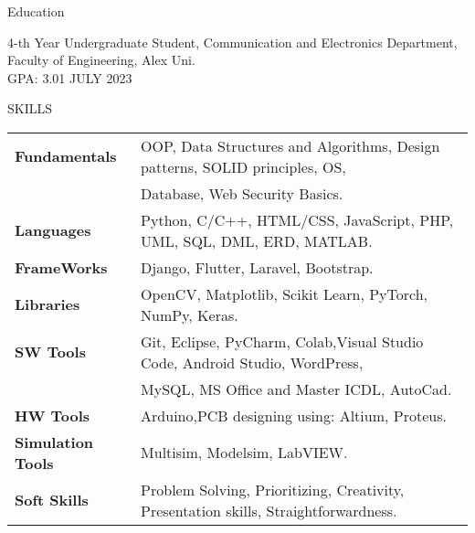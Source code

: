 \documentclass{resume} %
\begin{document}
\begin{rSection}{PROJECTS} 
    \href{https://github.com/AsmaaJAH}{https://github.com/AsmaaJAH }}  
\end{rSection}





\begin{rSection}{Education}

{ 4-th Year Undergraduate Student, Communication and Electronics Department}, Faculty of Engineering, Alex Uni.\\
GPA: 3.01 \hfill {JULY 2023}


\end{rSection}


\begin{rSection}{SKILLS}
\begin{tabular}{ @{} >{\bfseries}l @{\hspace{6ex}} l }
Fundamentals & OOP, Data Structures and Algorithms, Design patterns, SOLID principles, OS,\\ & Database, Web Security Basics.\\
Languages & Python, C/C++, HTML/CSS, JavaScript, PHP, UML, SQL, DML, ERD, MATLAB.\\
FrameWorks & Django, Flutter, Laravel, Bootstrap.\\
Libraries & OpenCV, Matplotlib, Scikit Learn, PyTorch, NumPy, Keras.\\
SW Tools & Git, Eclipse, PyCharm, Colab,Visual Studio Code, Android Studio, WordPress,\\ & MySQL, MS Office and Master ICDL,  AutoCad.\\
HW Tools & Arduino,PCB designing using: Altium, Proteus.\\
Simulation Tools& Multisim, Modelsim, LabVIEW.\\
Soft Skills &  Problem Solving, Prioritizing, Creativity, Presentation skills, Straightforwardness.\\
\end{tabular}\\
\end{rSection}
\end{document}
